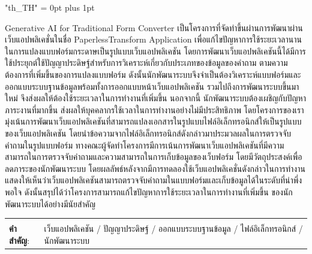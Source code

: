 \documentclass[12pt,oneside,openright,a4paper]{cpe-english-project}
\begin{document}
{
\XeTeXlinebreaklocale "th_TH"	
\XeTeXlinebreakskip = 0pt plus 1pt
\thaifont
\thaiabstract

Generative AI for Traditional Form Converter เป็นโครงการที่จัดทำขึ้นผ่านการพัฒนาผ่านเว็บแอปพลิเคชั่นในชื่อ PaperlessTransform Application
เพื่อแก้ไขปัญหาการใช้ระยะเวลานานในการแปลงแบบฟอร์มกระดาษเป็นรูปแบบเว็บแอปพลิเคชัน โดยการพัฒนาเว็บแอปพลิเคชันนี้ได้มีการใช้ประยุกต์ใช้ปัญญาประดิษฐ์สำหรับการวิเคราะห์เกี่ยวกับประเภทของข้อมูลของคำถาม 
ตามความต้องการที่เพิ่มขึ้นของการแปลงแบบฟอร์ม ดังนั้นนักพัฒนาระบบจึงจำเป็นต้องวิเคราะห์แบบฟอร์มและออกแบบระบบฐานข้อมูลพร้อมทั้งการออกแบบหน้าเว็บแอปพลิเคชัน รวมไปถึงการพัฒนาระบบขึ้นมาใหม่
จึงส่งผลให้ต้องใช้ระยะเวลาในการทำงานที่เพิ่มขึ้น นอกจากนี้ นักพัฒนาระบบต้องเผชิญกับปัญหาภาระงานที่มากขึ้น ส่งผลให้บุคคลากรใช้เวลาในการทำงานอย่างไม่มีประสิทธิภาพ 
โดยโครงการของเรามุ่งเน้นการพัฒนาเว็บแอปพลิเคชันที่สามารถแปลงเอกสารในรูปแบบไฟล์อิเล็กทรอนิกส์ให้เป็นรูปแบบของเว็บแอปพลิเคชัน 
โดยนำข้อความจากไฟล์อิเล็กทรอนิกส์ดังกล่าวมาประมวลผลในการตรวจจับคำถามในรูปแบบฟอร์ม 
ทางคณะผู้จัดทำโครงการมีการเน้นการพัฒนาเว็บแอปพลิเคชันที่มีความสามารถในการตรวจจับคำถามและความสามารถในการเก็บข้อมูลของเว็บฟอร์ม 
โดยมีวัตถุประสงค์เพื่อลดภาระของนักพัฒนาระบบ โดยผลลัพธ์หลังจากมีการทดลองใช้เว็บแอปพลิเคชั่นดังกล่าวในการทำงานแสดงให้เห็นว่าเว็บแอปพลิเคชันสามารถตรวจจับคำถามในแบบฟอร์มและเก็บข้อมูลได้ในระดับที่น่าพึ่งพอใจ ดังนั้นสรุปได้ว่าโครงการสามารถแก้ไขปัญหาการใช้ระยะเวลาในการทำงานที่เพิ่มขึ้น ของนักพัฒนาระบบได้อย่างมีนัยสำคัญ

\begin{flushleft}
\begin{tabular*}{\textwidth}{@{}lp{}}
 & \\

\textbf{คำสำคัญ}: & เว็บแอปพลิเคชัน / ปัญญาประดิษฐ์ /  ออกแบบระบบฐานข้อมูล / ไฟล์อิเล็กทรอนิกส์ / นักพัฒนาระบบ
\end{tabular*}
\end{flushleft}
\endabstract
}
\end{document}
